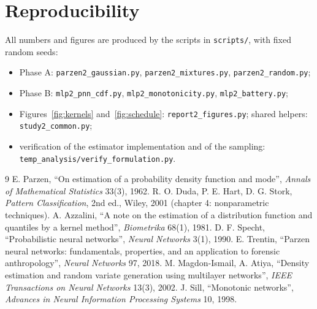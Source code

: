 \documentclass[11pt]{article}
\begin{document}
\appendix

\section{Reproducibility}

All numbers and figures are produced by the scripts in \texttt{scripts/}, with fixed random
seeds:

\begin{itemize}
  \item Phase A: \texttt{parzen2\_gaussian.py}, \texttt{parzen2\_mixtures.py},
        \texttt{parzen2\_random.py};
  \item Phase B: \texttt{mlp2\_pnn\_cdf.py}, \texttt{mlp2\_monotonicity.py},
        \texttt{mlp2\_battery.py};
  \item Figures~\ref{fig:kernels} and~\ref{fig:schedule}: \texttt{report2\_figures.py};
        shared helpers: \texttt{study2\_common.py};
  \item verification of the estimator implementation and of the sampling:\\
        \texttt{temp\_analysis/verify\_formulation.py}.
\end{itemize}

\begin{thebibliography}{9}
 E. Parzen, ``On estimation of a probability density function and
mode'', \emph{Annals of Mathematical Statistics} 33(3), 1962.
 R. O. Duda, P. E. Hart, D. G. Stork, \emph{Pattern Classification},
2nd ed., Wiley, 2001 (chapter 4: nonparametric techniques).
 A. Azzalini, ``A note on the estimation of a distribution function
and quantiles by a kernel method'', \emph{Biometrika} 68(1), 1981.
 D. F. Specht, ``Probabilistic neural networks'', \emph{Neural
Networks} 3(1), 1990.
 E. Trentin, ``Parzen neural networks: fundamentals, properties, and
an application to forensic anthropology'', \emph{Neural Networks} 97, 2018.
 M. Magdon-Ismail, A. Atiya, ``Density estimation and random variate
generation using multilayer networks'', \emph{IEEE Transactions on Neural Networks} 13(3),
2002.
 J. Sill, ``Monotonic networks'', \emph{Advances in Neural Information
Processing Systems} 10, 1998.
\end{thebibliography}
\end{document}
